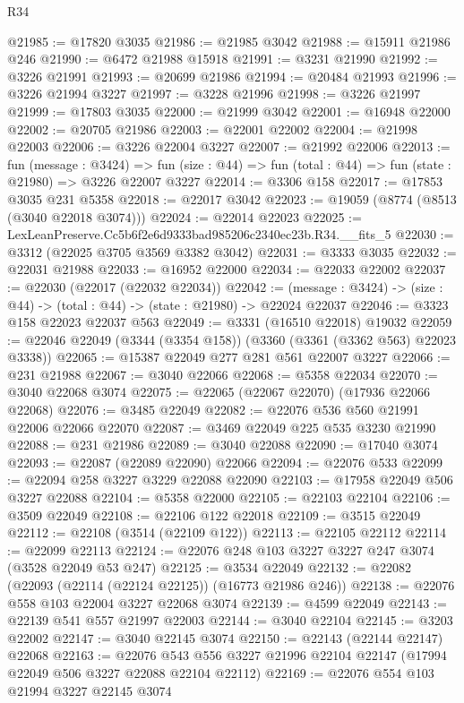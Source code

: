 \begin{lexlean}{R34}
\begin{coremodule}
@21985 := @17820 @3035
@21986 := @21985 @3042
@21988 := @15911 @21986 @246
@21990 := @6472 @21988 @15918
@21991 := @3231 @21990
@21992 := @3226 @21991
@21993 := @20699 @21986
@21994 := @20484 @21993
@21996 := @3226 @21994 @3227
@21997 := @3228 @21996
@21998 := @3226 @21997
@21999 := @17803 @3035
@22000 := @21999 @3042
@22001 := @16948 @22000
@22002 := @20705 @21986
@22003 := @22001 @22002
@22004 := @21998 @22003
@22006 := @3226 @22004 @3227
@22007 := @21992 @22006
@22013 := fun (message : @3424) =>
  fun (size : @44) => fun (total : @44) => fun (state : @21980) => @3226 @22007 @3227
@22014 := @3306 @158
@22017 := @17853 @3035 @231 @5358
@22018 := @22017 @3042
@22023 := @19059 (@8774 (@8513 (@3040 @22018 @3074)))
@22024 := @22014 @22023
@22025 := LexLeanPreserve.Cc5b6f2e6d9333bad985206c2340ec23b.R34.__fits_5
@22030 := @3312 (@22025 @3705 @3569 @3382 @3042)
@22031 := @3333 @3035
@22032 := @22031 @21988
@22033 := @16952 @22000
@22034 := @22033 @22002
@22037 := @22030 (@22017 (@22032 @22034))
@22042 := (message : @3424) -> (size : @44) -> (total : @44) -> (state : @21980) -> @22024 @22037
@22046 := @3323 @158 @22023 @22037 @563
@22049 := @3331 (@16510 @22018) @19032
@22059 := @22046 @22049 (@3344 (@3354 @158)) (@3360 (@3361 (@3362 @563) @22023 @3338))
@22065 := @15387 @22049 @277 @281 @561 @22007 @3227
@22066 := @231 @21988
@22067 := @3040 @22066
@22068 := @5358 @22034
@22070 := @3040 @22068 @3074
@22075 := @22065 (@22067 @22070) (@17936 @22066 @22068)
@22076 := @3485 @22049
@22082 := @22076 @536 @560 @21991 @22006 @22066 @22070
@22087 := @3469 @22049 @225 @535 @3230 @21990
@22088 := @231 @21986
@22089 := @3040 @22088
@22090 := @17040 @3074
@22093 := @22087 (@22089 @22090) @22066
@22094 := @22076 @533
@22099 := @22094 @258 @3227 @3229 @22088 @22090
@22103 := @17958 @22049 @506 @3227 @22088
@22104 := @5358 @22000
@22105 := @22103 @22104
@22106 := @3509 @22049
@22108 := @22106 @122 @22018
@22109 := @3515 @22049
@22112 := @22108 (@3514 (@22109 @122))
@22113 := @22105 @22112
@22114 := @22099 @22113
@22124 := @22076 @248 @103 @3227 @3227 @247 @3074 (@3528 @22049 @53 @247)
@22125 := @3534 @22049
@22132 := @22082 (@22093 (@22114 (@22124 @22125)) (@16773 @21986 @246))
@22138 := @22076 @558 @103 @22004 @3227 @22068 @3074
@22139 := @4599 @22049
@22143 := @22139 @541 @557 @21997 @22003
@22144 := @3040 @22104
@22145 := @3203 @22002
@22147 := @3040 @22145 @3074
@22150 := @22143 (@22144 @22147) @22068
@22163 := @22076
    @543
    @556
    @3227
    @21996
    @22104
    @22147
    (@17994 @22049 @506 @3227 @22088 @22104 @22112)
@22169 := @22076 @554 @103 @21994 @3227 @22145 @3074

\end{coremodule}
\end{lexlean}
